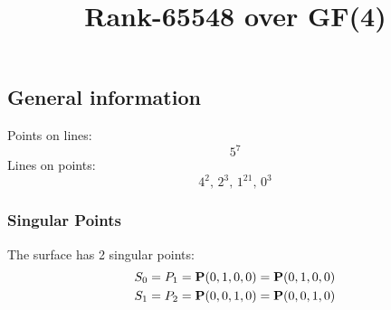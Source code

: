 \documentclass{article}
\newcommand\setTBstruts{\def\T{\rule{0pt}{2.6ex}}%
\def\B{\rule[-1.2ex]{0pt}{0pt}}}
\newcommand{\bP}{{\bf P}}
\begin{document}
 
\setTBstruts



{\allowdisplaybreaks%






\title{Rank-65548 over GF(4)}
\author{}%
\maketitle%
%
{}



\subsection*{General information}
Points on lines:
$$
5^7$$
Lines on points:
$$
4^2,\,2^3,\,1^{21},\,0^3$$
\subsubsection*{Singular Points}
The surface has 2 singular points:\\
\begin{align*}
S_{0} &= P_{1}=\bP(0, 1, 0, 0) = \bP(0, 1, 0, 0)\\
S_{1} &= P_{2}=\bP(0, 0, 1, 0) = \bP(0, 0, 1, 0)\\
\end{align*}
}
\end{document}
